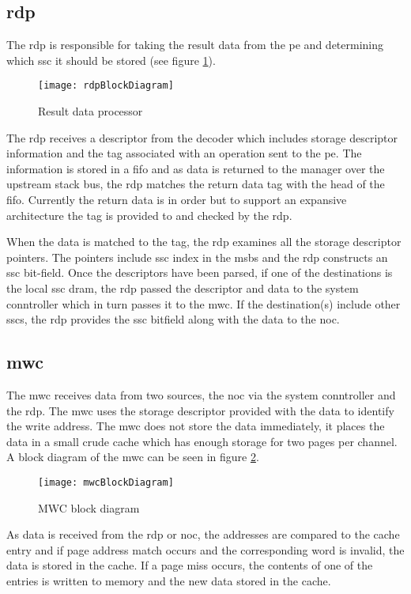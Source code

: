 \subsection{\Acf{rdp}}
\label{sec:RDP}
The \ac{rdp} is responsible for taking the result data from the \ac{pe} and determining which \ac{ssc} it should be stored (see figure \ref{fig:RDP block diagram}).

\begin{figure}[h]
\centering
\captionsetup{justification=centering}
\captionsetup{width=.9\linewidth}
\centerline{
\mbox{\texttt{[image: rdpBlockDiagram]}}
}
\center\caption{Result data processor}
\label{fig:RDP block diagram}
\end{figure}

The \ac{rdp} receives a descriptor from the decoder which includes storage descriptor information and the tag associated with an operation sent to the \ac{pe}.
The information is stored in a \ac{fifo} and as data is returned to the manager over the upstream stack bus, the \ac{rdp} matches the return data tag with the head of the \ac{fifo}.
Currently the return data is in order but to support an expansive architecture the tag is provided to and checked by the \ac{rdp}.

When the data is matched to the tag, the \ac{rdp} examines all the storage descriptor pointers. The pointers include \ac{ssc} index in the \acp{msb} and the \ac{rdp} constructs an \ac{ssc} bit-field.
Once the descriptors have been parsed, if one of the destinations is the local \ac{ssc} \ac{dram}, the \ac{rdp} passed the descriptor and data to the system conntroller which in turn passes it to the \ac{mwc}.
If the destination(s) include other \acp{ssc}, the \ac{rdp} provides the \ac{ssc} bitfield along with the data to the \ac{noc}.


\subsection{\Acf{mwc}}
\label{sec:MWC}

The \acf{mwc} receives data from two sources, the \ac{noc} via the system conntroller and the \ac{rdp}.
The \ac{mwc} uses the storage descriptor provided with the data to identify the write address.
The \ac{mwc} does not store the data immediately, it places the data in a small crude cache which has enough storage for two pages per channel.
A block diagram of the \ac{mwc} can be seen in figure \ref{fig:MWC block diagram}.
\begin{figure}[h]
\centering
\captionsetup{justification=centering}
\captionsetup{width=.9\linewidth}
\centerline{
\mbox{\texttt{[image: mwcBlockDiagram]}}
}
\center\caption{MWC block diagram}
\label{fig:MWC block diagram}
\end{figure}
As data is received from the \ac{rdp} or \ac{noc}, the addresses are compared to the cache entry and if page address match occurs and the corresponding word is invalid, the data is stored in the cache.
If a page miss occurs, the contents of one of the entries is written to memory and the new data stored in the cache.

